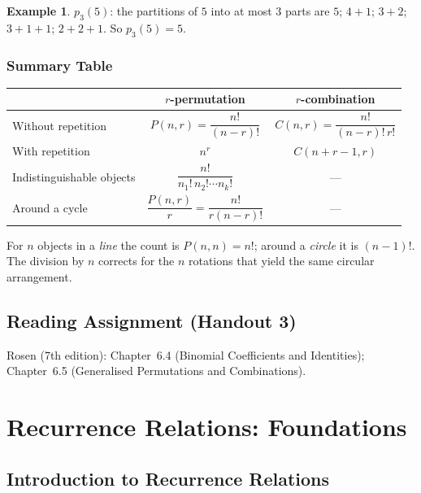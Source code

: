 \documentclass[11pt, a4paper, notitlepage]{report}
\theoremstyle{definition}
\newtheorem{example}[theorem]{Example}
\theoremstyle{remark}
\begin{document}
\begin{example}
$p_3(5)$: the partitions of $5$ into at most $3$ parts are
$5$; $4+1$; $3+2$; $3+1+1$; $2+2+1$.
So $p_3(5) = 5$.
\end{example}

\subsection{Summary Table}

\begin{center}
\renewcommand{\arraystretch}{1.6}
\begin{tabular}{lcc}
\hline
& \textbf{$r$-permutation} & \textbf{$r$-combination} \\
\hline
Without repetition & $P(n,r) = \dfrac{n!}{(n-r)!}$ & $C(n,r) = \dfrac{n!}{(n-r)!\,r!}$ \\[6pt]
With repetition    & $n^r$ & $C(n+r-1,r)$ \\[6pt]
Indistinguishable objects & $\dfrac{n!}{n_1!\,n_2!\cdots n_k!}$ & --- \\[6pt]
Around a cycle     & $\dfrac{P(n,r)}{r} = \dfrac{n!}{r(n-r)!}$ & --- \\
\hline
\end{tabular}
\end{center}

\begin{warning}[title={Warning: Circular vs.\ Linear}]
For $n$ objects in a \emph{line} the count is $P(n,n) = n!$; around a \emph{circle} it is
$(n-1)!$.  The division by $n$ corrects for the $n$ rotations that yield the same circular
arrangement.
\end{warning}

\section*{Reading Assignment (Handout 3)}
Rosen (7th edition): Chapter~6.4 (Binomial Coefficients and Identities);
Chapter~6.5 (Generalised Permutations and Combinations).

\chapter{Recurrence Relations: Foundations}
\label{chap:recurrence-foundations}

\section{Introduction to Recurrence Relations}
\label{sec:recurrence-intro}
\end{document}
